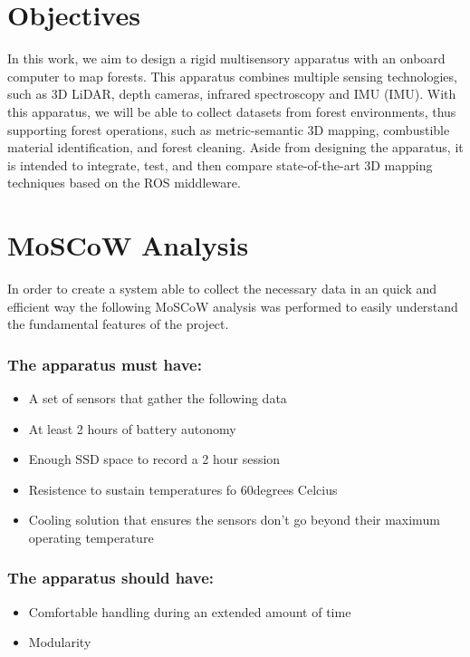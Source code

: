 \section{Objectives}
In this work, we aim to design a rigid multisensory apparatus with an onboard computer to map forests. This apparatus combines multiple sensing technologies, such as 3D \acs{LiDAR}, depth cameras, infrared spectroscopy and \acl{IMU} (\acs{IMU}). With this apparatus, we will be able to collect datasets from forest environments, thus supporting forest operations, such as metric-semantic 3D mapping, combustible material identification, and forest cleaning. Aside from designing the apparatus, it is intended to integrate, test, and then compare state-of-the-art 3D mapping techniques based on the ROS middleware.

\section{MoSCoW Analysis}

In order to create a system able to collect the necessary data in an quick and efficient way the following MoSCoW analysis was performed to easily understand the fundamental features of the project.

\subsubsection*{The apparatus must have:}

\begin{itemize}
    \item A set of sensors that gather the following data
    \item At least 2 hours of battery autonomy
    \item Enough SSD space to record a 2 hour session 
    \item Resistence to sustain temperatures fo 60degrees Celcius
    \item Cooling solution that ensures the sensors don't go beyond their maximum operating temperature
\end{itemize}

\subsubsection*{The apparatus should have:}
\begin{itemize}
    \item Comfortable handling during an extended amount of time
    \item Modularity
\end{itemize}

